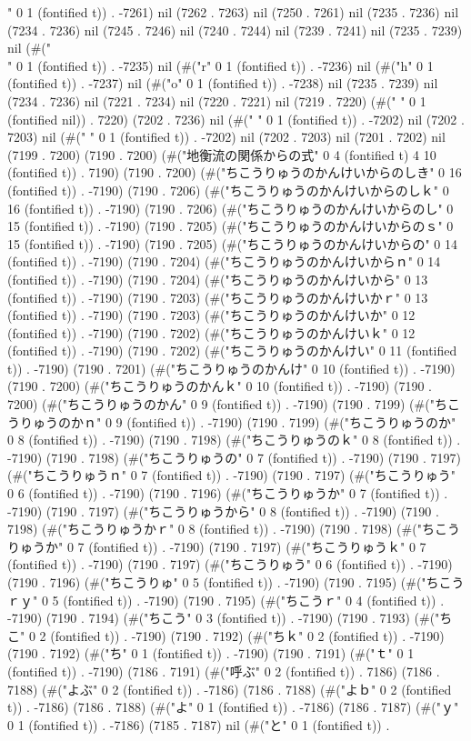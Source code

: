 {" 0 1 (fontified t)) . -7261) nil (7262 . 7263) nil (7250 . 7261) nil (7235 . 7236) nil (7234 . 7236) nil (7245 . 7246) nil (7240 . 7244) nil (7239 . 7241) nil (7235 . 7239) nil (#("\\" 0 1 (fontified t)) . -7235) nil (#("r" 0 1 (fontified t)) . -7236) nil (#("h" 0 1 (fontified t)) . -7237) nil (#("o" 0 1 (fontified t)) . -7238) nil (7235 . 7239) nil (7234 . 7236) nil (7221 . 7234) nil (7220 . 7221) nil (7219 . 7220) (#(" " 0 1 (fontified nil)) . 7220) (7202 . 7236) nil (#(" " 0 1 (fontified t)) . -7202) nil (7202 . 7203) nil (#(" " 0 1 (fontified t)) . -7202) nil (7202 . 7203) nil (7201 . 7202) nil (7199 . 7200) (7190 . 7200) (#("地衡流の関係からの式" 0 4 (fontified t) 4 10 (fontified t)) . 7190) (7190 . 7200) (#("ちこうりゅうのかんけいからのしき" 0 16 (fontified t)) . -7190) (7190 . 7206) (#("ちこうりゅうのかんけいからのしｋ" 0 16 (fontified t)) . -7190) (7190 . 7206) (#("ちこうりゅうのかんけいからのし" 0 15 (fontified t)) . -7190) (7190 . 7205) (#("ちこうりゅうのかんけいからのｓ" 0 15 (fontified t)) . -7190) (7190 . 7205) (#("ちこうりゅうのかんけいからの" 0 14 (fontified t)) . -7190) (7190 . 7204) (#("ちこうりゅうのかんけいからｎ" 0 14 (fontified t)) . -7190) (7190 . 7204) (#("ちこうりゅうのかんけいから" 0 13 (fontified t)) . -7190) (7190 . 7203) (#("ちこうりゅうのかんけいかｒ" 0 13 (fontified t)) . -7190) (7190 . 7203) (#("ちこうりゅうのかんけいか" 0 12 (fontified t)) . -7190) (7190 . 7202) (#("ちこうりゅうのかんけいｋ" 0 12 (fontified t)) . -7190) (7190 . 7202) (#("ちこうりゅうのかんけい" 0 11 (fontified t)) . -7190) (7190 . 7201) (#("ちこうりゅうのかんけ" 0 10 (fontified t)) . -7190) (7190 . 7200) (#("ちこうりゅうのかんｋ" 0 10 (fontified t)) . -7190) (7190 . 7200) (#("ちこうりゅうのかん" 0 9 (fontified t)) . -7190) (7190 . 7199) (#("ちこうりゅうのかｎ" 0 9 (fontified t)) . -7190) (7190 . 7199) (#("ちこうりゅうのか" 0 8 (fontified t)) . -7190) (7190 . 7198) (#("ちこうりゅうのｋ" 0 8 (fontified t)) . -7190) (7190 . 7198) (#("ちこうりゅうの" 0 7 (fontified t)) . -7190) (7190 . 7197) (#("ちこうりゅうｎ" 0 7 (fontified t)) . -7190) (7190 . 7197) (#("ちこうりゅう" 0 6 (fontified t)) . -7190) (7190 . 7196) (#("ちこうりゅうか" 0 7 (fontified t)) . -7190) (7190 . 7197) (#("ちこうりゅうから" 0 8 (fontified t)) . -7190) (7190 . 7198) (#("ちこうりゅうかｒ" 0 8 (fontified t)) . -7190) (7190 . 7198) (#("ちこうりゅうか" 0 7 (fontified t)) . -7190) (7190 . 7197) (#("ちこうりゅうｋ" 0 7 (fontified t)) . -7190) (7190 . 7197) (#("ちこうりゅう" 0 6 (fontified t)) . -7190) (7190 . 7196) (#("ちこうりゅ" 0 5 (fontified t)) . -7190) (7190 . 7195) (#("ちこうｒｙ" 0 5 (fontified t)) . -7190) (7190 . 7195) (#("ちこうｒ" 0 4 (fontified t)) . -7190) (7190 . 7194) (#("ちこう" 0 3 (fontified t)) . -7190) (7190 . 7193) (#("ちこ" 0 2 (fontified t)) . -7190) (7190 . 7192) (#("ちｋ" 0 2 (fontified t)) . -7190) (7190 . 7192) (#("ち" 0 1 (fontified t)) . -7190) (7190 . 7191) (#("ｔ" 0 1 (fontified t)) . -7190) (7186 . 7191) (#("呼ぶ" 0 2 (fontified t)) . 7186) (7186 . 7188) (#("よぶ" 0 2 (fontified t)) . -7186) (7186 . 7188) (#("よｂ" 0 2 (fontified t)) . -7186) (7186 . 7188) (#("よ" 0 1 (fontified t)) . -7186) (7186 . 7187) (#("ｙ" 0 1 (fontified t)) . -7186) (7185 . 7187) nil (#("と" 0 1 (fontified t)) . }
